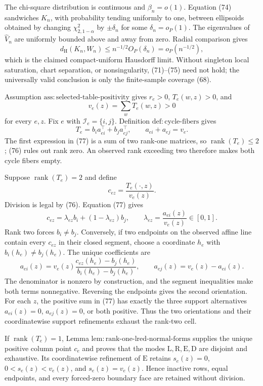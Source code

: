 The chi-square distribution is continuous and \(\beta_n=o(1)\).  Equation (74) sandwiches \(K_n\), with probability tending uniformly to one, between ellipsoids obtained by changing \(\chi^2_{2,1-\alpha}\) by \(\pm\delta_n\) for some \(\delta_n=o_P(1)\).  The eigenvalues of \(\widehat V_n\) are uniformly bounded above and away from zero.  Radial comparison gives
\[
 d_{\mathrm H}(K_n,W_n)
 \le n^{-1/2}O_P(\delta_n)=o_P(n^{-1/2}),                 \tag{75}
\]
which is the claimed compact-uniform Hausdorff limit.  Without singleton local saturation, chart separation, or nonsingularity, (71)--(75) need not hold; the universally valid conclusion is only the finite-sample coverage (68).

Assumption \(\mathrm{ass{:}selected\text{-}table\text{-}positivity}\) gives \(r_e>0\), \(T_e(w,z)>0\), and
\[
 v_e(z)=\sum_wT_e(w,z)>0                                  \tag{76}
\]
for every \(e,z\).  Fix \(e\) with \(\mathcal I_e=\{i,j\}\).  Definition \(\mathrm{def{:}cycle\text{-}fibers}\) gives
\[
 T_e=b_i a_{ei}^{\top}+b_j a_{ej}^{\top},
 \qquad
 a_{ei}+a_{ej}=v_e.                                       \tag{77}
\]
The first expression in (77) is a sum of two rank-one matrices, so \(\operatorname{rank}(T_e)\le2\); (76) rules out rank zero.  An observed rank exceeding two therefore makes both cycle fibers empty.

Suppose \(\operatorname{rank}(T_e)=2\) and define
\[
 c_{ez}=\frac{T_e(\cdot,z)}{v_e(z)}.
\]
Division is legal by (76).  Equation (77) gives
\[
 c_{ez}=\lambda_{ez}b_i+(1-\lambda_{ez})b_j,
 \qquad
 \lambda_{ez}=\frac{a_{ei}(z)}{v_e(z)}\in[0,1].           \tag{78}
\]
Rank two forces \(b_i\ne b_j\).  Conversely, if two endpoints on the observed affine line contain every \(c_{ez}\) in their closed segment, choose a coordinate \(h_e\) with \(b_i(h_e)\ne b_j(h_e)\).  The unique coefficients are
\[
 a_{ei}(z)=v_e(z)
 \frac{c_{ez}(h_e)-b_j(h_e)}{b_i(h_e)-b_j(h_e)},
 \qquad
 a_{ej}(z)=v_e(z)-a_{ei}(z).                              \tag{79}
\]
The denominator is nonzero by construction, and the segment inequalities make both terms nonnegative.  Reversing the endpoints gives the second orientation.  For each \(z\), the positive sum in (77) has exactly the three support alternatives \(a_{ei}(z)=0\), \(a_{ej}(z)=0\), or both positive.  Thus the two orientations and their coordinatewise support refinements exhaust the rank-two cell.

If \(\operatorname{rank}(T_e)=1\), Lemma \(\mathrm{lem{:}rank\text{-}one\text{-}lred\text{-}normal\text{-}forms}\) supplies the unique positive column point \(c_e\) and proves that the modes \(\mathrm L,\mathrm R,\mathrm E,\mathrm D\) are disjoint and exhaustive.  Its coordinatewise refinement of \(\mathrm E\) retains \(s_e(z)=0\), \(0<s_e(z)<v_e(z)\), and \(s_e(z)=v_e(z)\).  Hence inactive rows, equal endpoints, and every forced-zero boundary face are retained without division.

